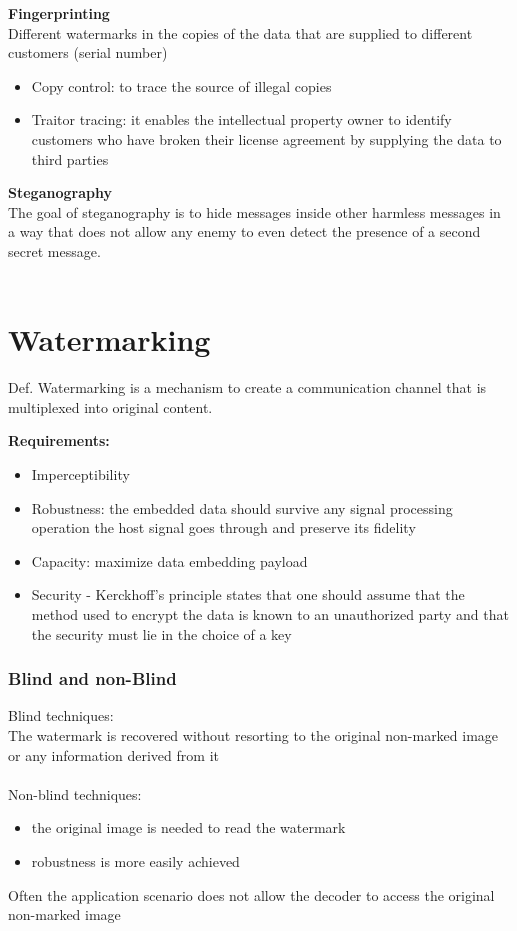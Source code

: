 \documentclass[10pt,a4paper]{book}
\begin{document}
\textbf{Fingerprinting}\\
Different watermarks in the copies of the data that are supplied to different customers (serial number) 
\begin{itemize}
\item Copy control: to trace the source of illegal copies 
\item Traitor tracing: it enables the intellectual property owner to identify customers who have broken their license agreement by supplying the data to third parties
\end{itemize}
\textbf{Steganography}\\
The goal of steganography is to hide messages inside other harmless  messages in a way that does not allow any enemy to even detect the presence of a second secret message.\\\\

\chapter{Watermarking}

Def. Watermarking is a mechanism to create a communication channel that is multiplexed into original content.

\textbf{Requirements:}
\begin{itemize}
\item Imperceptibility 
\item Robustness: the embedded data should survive any signal processing operation the host signal 		goes through and preserve its fidelity 
\item Capacity: maximize data embedding payload
\item Security - Kerckhoff's principle states that one should assume that the method used to encrypt the data is known to an unauthorized party and that the security must lie in the choice of a key 
\end{itemize}

\subsection{Blind and non-Blind}

Blind techniques:\\
The watermark is recovered without resorting to the original non-marked image or any information derived from it \\\\
Non-blind techniques:
\begin{itemize}
\item the original image is needed to read the watermark 
\item robustness is more easily achieved 
\end{itemize}
Often the application scenario does not allow the decoder to access the original non-marked image
\end{document}
